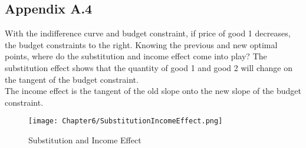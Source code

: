 \subsection*{Appendix A.4}
With the indifference curve and budget constraint,
if price of good 1 decreases, the budget constraints to the right.
Knowing the previous and new optimal points, where do the substitution
and income effect come into play? The substitution effect shows that
the quantity of good 1 and good 2 will change on the tangent of the budget constraint.\\
The income effect is the tangent of the old slope onto the new slope of the budget constraint.
\begin{figure}[H]
    \centering
    \texttt{[image: Chapter6/SubstitutionIncomeEffect.png]}
    \caption{Substitution and Income Effect}
    \label{fig:Substitution_Income_Effect}
\end{figure}
